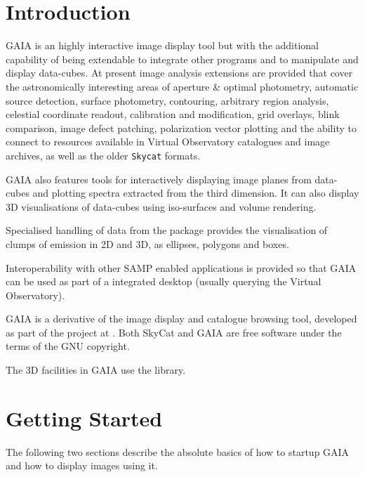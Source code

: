\documentclass[twoside,11pt,nolof]{starlink}
\providecommand{\mytt}[1]{{\texttt{#1}}}
\begin{document}
\scfrontmatter


\section{Introduction\label{introduction}}

GAIA is an highly interactive image display tool but with the additional
capability of being extendable to integrate other programs and to manipulate
and display data-cubes.  At present image analysis extensions are provided
that cover the astronomically interesting areas of aperture \& optimal
photometry, automatic source detection, surface photometry, contouring,
arbitrary region analysis, celestial coordinate readout, calibration and
modification, grid overlays, blink comparison, image defect patching,
polarization vector plotting and the ability to connect to resources available
in Virtual Observatory catalogues and image archives, as well as the older
\mytt{Skycat} formats.

GAIA also features tools for interactively displaying image planes from
data-cubes and plotting spectra extracted from the third dimension. It can
also display 3D visualisations of data-cubes using iso-surfaces and volume
rendering.

Specialised handling of data from the  package provides
the visualisation of clumps of emission in 2D and 3D, as ellipses, polygons
and boxes.

Interoperability with other SAMP enabled applications is provided so that
GAIA can be used as part of a integrated desktop (usually querying the
Virtual Observatory).

GAIA is a derivative of the
 image
display and catalogue browsing tool, developed as part of the
 project at
. Both SkyCat and GAIA are
free software under the terms of the GNU copyright.

The 3D facilities in GAIA use the
 library.

\section{Getting Started}

The following two sections describe the absolute basics of how to
startup GAIA and how to display images using it.
\end{document}
